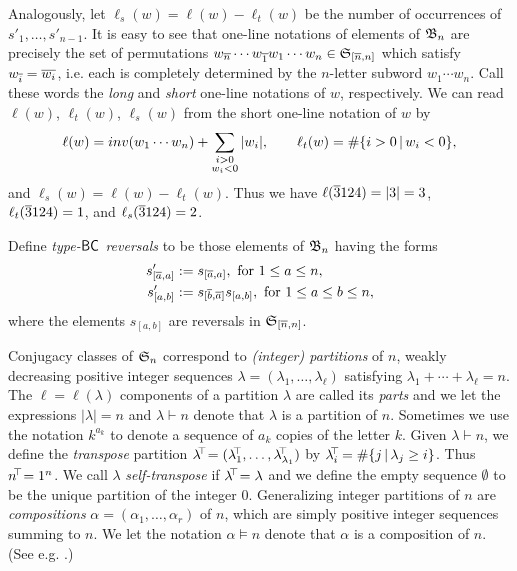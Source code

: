 \documentclass[11pt]{article}
\theoremstyle{definition}
\numberwithin{equation}{section}
\begin{document}
Analogously, let $\ell_s(w) = \ell(w) - \ell_t(w)$ be the number
of occurrences of $s'_1,\dotsc,s'_{n-1}$.
It is easy to see that one-line notations of
elements of $\mathfrak{B}_n$ are precisely the set of
permutations $w_{\overline{n}} \cdots w_{\overline{1}} w_1 \cdots w_n \in \mathfrak{S}_{\smash{[\overline{n}, n]}}$
which satisfy $w_{\overline{i}} = \overline{w_i}$,
i.e. each is completely determined by the $n$-letter subword
$w_1 \cdots w_n$.
Call these words the {\em long} and
{\em short}
one-line notations of $w$, respectively.
We can read $\ell(w)$, $\ell_t(w)$, $\ell_s(w)$ from the
short one-line notation of $w$ by
\begin{equation*}%
  \ell(w) = \inv(w_1 \cdots w_n) + \sumsb{i > 0\\ w_i < 0} |w_i|,
  \qquad
  \ell_t(w) = \# \{ i > 0 \,|\, w_i < 0 \},
  \end{equation*}
and $\ell_s(w) = \ell(w) - \ell_t(w)$.
Thus we have
  $\ell(\overline{3}124) = |3| = 3$, $\ell_t(\overline{3}124) = 1$, and $\ell_s(\overline{3}124) = 2$.

Define {\em type-$\mathsf{BC}$ reversals} to be those elements of $\mathfrak{B}_n$
having the forms
\begin{equation}\label{eq:creversal}
  \begin{aligned}
    s'_{\smash{[\ol a, a]}} &\defeq s_{\smash{[\ol a, a]}},
        \mbox{ for } 1 \leq a \leq n,\\
    s'_{\smash{[a,b]}} &\defeq s_{\smash{[\ol b, \ol a]}} s_{[a,b]},
    \mbox{ for } 1 \leq a \leq b \leq n,
  \end{aligned}
\end{equation}
where the elements $s_{[a,b]}$ are reversals in $\mathfrak{S}_{\smash{[\overline{n}, n]}}$.

\label{ss:conjclasses}
Conjugacy classes of $\mathfrak{S}_n$ correspond to {\em (integer) partitions} of $n$,
weakly decreasing positive integer sequences
$\lambda = (\lambda_1, \dotsc, \lambda_\ell)$
satisfying $\lambda_1 + \cdots + \lambda_\ell = n$.
The $\ell = \ell(\lambda)$ components of a partition $\lambda$
are called its {\em parts}
and we let the expressions
$|\lambda| = n$ and $\lambda \vdash n$ denote that $\lambda$ is
a partition of $n$.
Sometimes we use the notation $k^{a_k}$ to denote a
sequence of $a_k$ copies of the letter $k$.
Given $\lambda \vdash n$, we define the {\em transpose}
partition $\lambda^{\negthickspace \top \negthickspace} = (\lambda_1^{\negthickspace \top \negthickspace}, \dotsc,\lambda_{\lambda_1}^{{\negthickspace \top \negthickspace}})$ by
$\lambda_i^{\negthickspace \top \negthickspace} = \# \{ j \,|\, \lambda_j \geq i \}$. Thus $n^{\negthickspace \top \negthickspace} = 1^n$.
We call $\lambda$ {\em self-transpose} if $\lambda^{\negthickspace \top \negthickspace} = \lambda$
and we define the empty sequence $\emptyset$ to be the unique partition of the
integer $0$.
Generalizing integer partitions of $n$ are
{\em compositions} $\alpha = (\alpha_1,\dotsc, \alpha_r)$ of $n$,
which are simply positive integer sequences summing to $n$.
We let the notation $\alpha \vDash n$ denote that $\alpha$ is
a composition of $n$. (See e.g. \cite[\S 1.2]{StanEC1}.)
\end{document}
